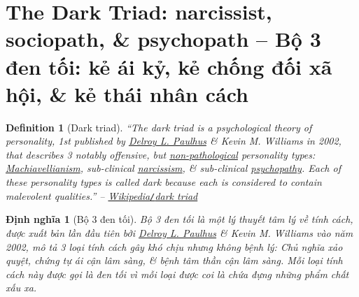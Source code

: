 \documentclass[12pt,oneside]{book}
\newtheorem{definition}{Definition}[section]
\newtheorem{dinhnghia}{Định nghĩa}[section]
\begin{document}
\section{The Dark Triad: narcissist, sociopath, \& psychopath -- Bộ 3 đen tối: kẻ ái kỷ, kẻ chống đối xã hội, \& kẻ thái nhân cách}

\begin{definition}[Dark triad]
	``The \emph{dark triad} is a psychological theory of personality, 1st published by \href{https://en.wikipedia.org/wiki/Delroy_L._Paulhus}{\sc Delroy L. Paulhus} \& {\sc Kevin M. Williams} in 2002, that describes 3 notably offensive, but \href{https://en.wikipedia.org/wiki/Psychopathology}{non-pathological} personality types: \href{https://en.wikipedia.org/wiki/Machiavellianism_(psychology)}{Machiavellianism}, sub-clinical \href{https://en.wikipedia.org/wiki/Narcissism}{narcissism}, \& sub-clinical \href{https://en.wikipedia.org/wiki/Psychopathy}{psychopathy}. Each of these personality types is called \emph{dark} because each is considered to contain malevolent qualities.'' -- \href{https://en.wikipedia.org/wiki/Dark_triad}{Wikipedia{\tt/}dark triad}
\end{definition}

\begin{dinhnghia}[Bộ 3 đen tối]
	\emph{Bộ 3 đen tối} là một lý thuyết tâm lý về tính cách, được xuất bản lần đầu tiên bởi \href{https://en.wikipedia.org/wiki/Delroy_L._Paulhus}{\sc Delroy L. Paulhus} \& {\sc Kevin M. Williams} vào năm 2002, mô tả 3 loại tính cách gây khó chịu nhưng không bệnh lý: Chủ nghĩa xảo quyệt, chứng tự ái cận lâm sàng, \& bệnh tâm thần cận lâm sàng. Mỗi loại tính cách này được gọi là \emph{đen tối} vì mỗi loại được coi là chứa đựng những phẩm chất xấu xa.
\end{dinhnghia}
\end{document}
